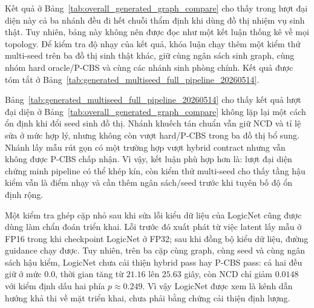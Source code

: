 \documentclass[oneside,a4paper,12pt]{extreport}
\begin{document}
Kết quả ở Bảng~\ref{tab:overall_generated_graph_compare} cho thấy trong lượt đại diện này cả ba nhánh đều đi hết chuỗi thẩm định khi dùng đồ thị nhiệm vụ sinh thật. Tuy nhiên, bảng này không nên được đọc như một kết luận thống kê về mọi topology. Để kiểm tra độ nhạy của kết quả, khóa luận chạy thêm một kiểm thử multi-seed trên ba đồ thị sinh thật khác, giữ cùng ngân sách sinh graph, cùng nhóm hard oracle/P-CBS và cùng các nhánh sinh phòng chính. Kết quả được tóm tắt ở Bảng~\ref{tab:generated_multiseed_full_pipeline_20260514}.

\begin{table}[H]
\centering
\small
\setlength{\tabcolsep}{4pt}
\renewcommand{\arraystretch}{1.08}
\caption{Kiểm thử multi-seed end-to-end trên ba đồ thị nhiệm vụ sinh thật mới}
\label{tab:generated_multiseed_full_pipeline_20260514}
\end{table}

Bảng~\ref{tab:generated_multiseed_full_pipeline_20260514} cho thấy kết quả lượt đại diện ở Bảng~\ref{tab:overall_generated_graph_compare} không lặp lại một cách ổn định khi đổi seed sinh đồ thị. Nhánh khuếch tán chuẩn vẫn giữ NCD và tỉ lệ sửa ở mức hợp lý, nhưng không còn vượt hard/P-CBS trong ba đồ thị bổ sung. Nhánh lấy mẫu rút gọn có một trường hợp vượt hybrid contract nhưng vẫn không được P-CBS chấp nhận. Vì vậy, kết luận phù hợp hơn là: lượt đại diện chứng minh pipeline có thể khép kín, còn kiểm thử multi-seed cho thấy tầng hậu kiểm vẫn là điểm nhạy và cần thêm ngân sách/seed trước khi tuyên bố độ ổn định rộng.

Một kiểm tra ghép cặp nhỏ sau khi sửa lỗi kiểu dữ liệu của LogicNet cũng được dùng làm chẩn đoán triển khai. Lỗi trước đó xuất phát từ việc latent lấy mẫu ở FP16 trong khi checkpoint LogicNet ở FP32; sau khi đồng bộ kiểu dữ liệu, đường guidance chạy được. Tuy nhiên, trên ba cặp cùng graph, cùng seed và cùng ngân sách hậu kiểm, LogicNet chưa cải thiện hybrid pass hay P-CBS pass: cả hai đều giữ ở mức $0.0$, thời gian tăng từ $21.16$ lên $25.63$ giây, còn NCD chỉ giảm $0.0148$ với kiểm định dấu hai phía $p \approx 0.249$. Vì vậy LogicNet được xem là kênh dẫn hướng khả thi về mặt triển khai, chưa phải bằng chứng cải thiện định lượng.
\end{document}
